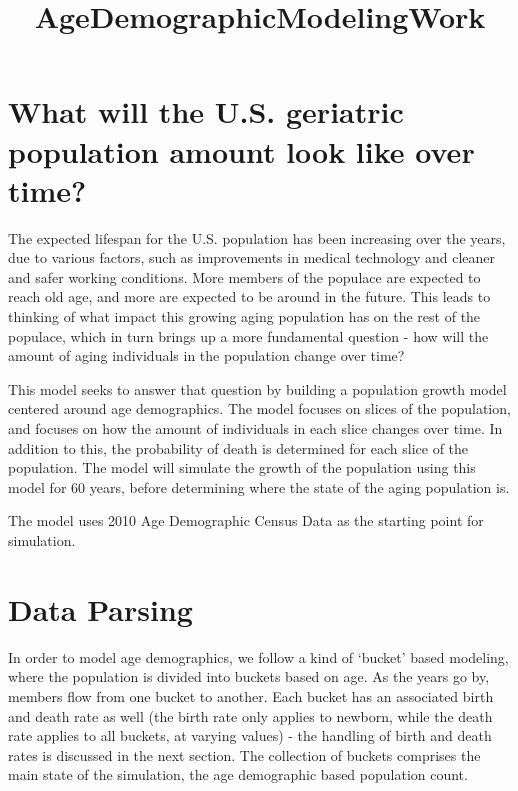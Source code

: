 \documentclass[11pt]{article}
\title{AgeDemographicModelingWork}
\begin{document}
    
    
    \maketitle
    
    

    
    \hypertarget{what-will-the-u.s.-geriatric-population-amount-look-like-over-time}{%
\section{What will the U.S. geriatric population amount look like over
time?}\label{what-will-the-u.s.-geriatric-population-amount-look-like-over-time}}

    The expected lifespan for the U.S. population has been increasing over
the years, due to various factors, such as improvements in medical
technology and cleaner and safer working conditions. More members of the
populace are expected to reach old age, and more are expected to be
around in the future. This leads to thinking of what impact this growing
aging population has on the rest of the populace, which in turn brings
up a more fundamental question - how will the amount of aging
individuals in the population change over time?

This model seeks to answer that question by building a population growth
model centered around age demographics. The model focuses on slices of
the population, and focuses on how the amount of individuals in each
slice changes over time. In addition to this, the probability of death
is determined for each slice of the population. The model will simulate
the growth of the population using this model for 60 years, before
determining where the state of the aging population is.

The model uses 2010 Age Demographic Census Data as the starting point
for simulation.

    \hypertarget{data-parsing}{%
\section{Data Parsing}\label{data-parsing}}

    In order to model age demographics, we follow a kind of `bucket' based
modeling, where the population is divided into buckets based on age. As
the years go by, members flow from one bucket to another. Each bucket
has an associated birth and death rate as well (the birth rate only
applies to newborn, while the death rate applies to all buckets, at
varying values) - the handling of birth and death rates is discussed in
the next section. The collection of buckets comprises the main state of
the simulation, the age demographic based population count.
\end{document}
